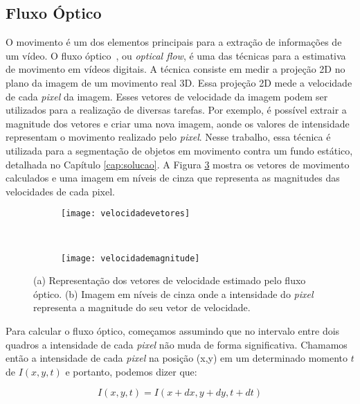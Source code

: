 \subsection{Fluxo Óptico}\label{sec:fluxooptico}

O movimento é um dos elementos principais para a extração de informações de um vídeo. O fluxo óptico~\cite{mota2011tensor}, ou \textit{optical flow}, é uma das técnicas para a estimativa de movimento em vídeos digitais. A técnica consiste em medir a projeção 2D no plano da imagem de um movimento real 3D. Essa projeção 2D mede a velocidade de cada \textit{pixel} da imagem. Esses vetores de velocidade da imagem podem ser utilizados para a realização de diversas tarefas. Por exemplo, é possível extrair a magnitude dos vetores e criar uma nova imagem, aonde os valores de intensidade representam o movimento realizado pelo \textit{pixel}. Nesse trabalho, essa técnica é utilizada para a segmentação de objetos em movimento contra um fundo estático, detalhada no Capítulo \ref{cap:solucao}. A Figura \ref{fig:fluxo} mostra os vetores de movimento calculados e uma imagem em níveis de cinza que representa as magnitudes das velocidades de cada pixel.

\begin{figure}
 \centering
\begin{subfigure}{.5\textwidth}
  \centering
  \texttt{[image: velocidadevetores]}
	\caption{}
	\label{fig:fluxo:sub:vetores}
	\centering
\end{subfigure}\
\begin{subfigure}{.5\textwidth}
  \centering
  \texttt{[image: velocidademagnitude]}
	\caption{}
	\label{fig:fluxo:sub:magnitude}
	\centering
\end{subfigure}
\caption{(a) Representação dos vetores de velocidade estimado pelo fluxo óptico. (b) Imagem em níveis de cinza onde a intensidade do \textit{pixel} representa a magnitude do seu vetor de velocidade.}
\label{fig:fluxo}
\centering
\end{figure}

Para calcular o fluxo óptico, começamos assumindo que no intervalo entre dois quadros a intensidade de cada \textit{pixel} não muda de forma significativa. Chamamos então a intensidade de cada \textit{pixel} na posição (x,y) em um determinado momento $t$ de $I(x,y,t)$ e portanto, podemos dizer que: 

\begin{equation}
	I(x,y,t) = I(x+dx, y+dy, t+dt)
\label{eq:fluxo1}
\end{equation} 

